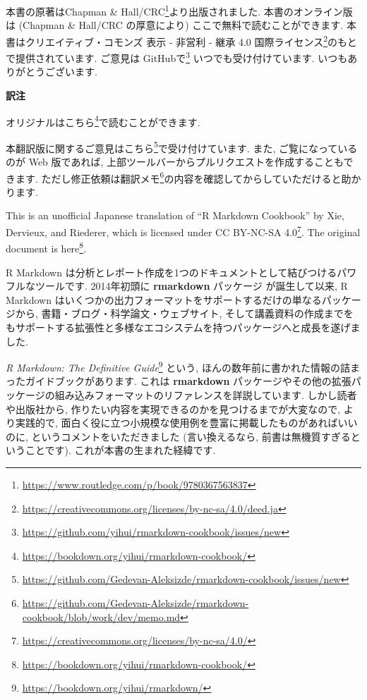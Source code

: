 \documentclass[
  11pt,
  lualatex,ja=standard,jafont=noto]{bxjsreport}
\newenvironment{infobox}[1]{\begin{itemize}\renewcommand{\labelitemi}{\raisebox{-.7\height}[0pt][0pt]{%
  {\setkeys{Gin}{width=3em,keepaspectratio}\texttt{[image: \_latex/\_img/\#1]}}}}
  \setlength{\fboxsep}{1em}
  \begin{greyblock}
  \item
  }{\end{greyblock}\end{itemize}
}
\renewcommand{\href}[2]{#2\footnote{\url{#1}}}
\begin{document}
\begin{infobox}{caution}
本書の原著は\href{https://www.routledge.com/p/book/9780367563837}{Chapman \& Hall/CRC}より出版されました. 本書のオンライン版は (Chapman \& Hall/CRC の厚意により) ここで無料で読むことができます. 本書は\href{https://creativecommons.org/licenses/by-nc-sa/4.0/deed.ja}{クリエイティブ・コモンズ 表示 - 非営利 - 継承 4.0 国際ライセンス}のもとで提供されています. ご意見は \href{https://github.com/yihui/rmarkdown-cookbook/issues/new}{GitHubで} いつでも受け付けています. いつもありがとうございます.

\begin{center}
\textbf{訳注}

\end{center}

オリジナルは\href{https://bookdown.org/yihui/rmarkdown-cookbook/}{こちら}で読むことができます.

本翻訳版に関するご意見は\href{https://github.com/Gedevan-Aleksizde/rmarkdown-cookbook/issues/new}{こちら}で受け付けています. また, ご覧になっているのが Web 版であれば, 上部ツールバーからプルリクエストを作成することもできます. ただし修正依頼は\href{https://github.com/Gedevan-Aleksizde/rmarkdown-cookbook/blob/work/dev/memo.md}{翻訳メモ}の内容を確認してからしていただけると助かります.

This is an unofficial Japanese translation of ``R Markdown Cookbook'' by Xie, Dervieux, and Riederer, which is licensed under \href{https://creativecommons.org/licenses/by-nc-sa/4.0/}{CC BY-NC-SA 4.0}. The original document is \href{https://bookdown.org/yihui/rmarkdown-cookbook/}{here}.

\end{infobox}

R Markdown は分析とレポート作成を1つのドキュメントとして結びつけるパワフルなツールです. 2014年初頭に \textbf{rmarkdown} パッケージ \autocite{R-rmarkdown} が誕生して以来, R Markdown はいくつかの出力フォーマットをサポートするだけの単なるパッケージから, 書籍・ブログ・科学論文・ウェブサイト, そして講義資料の作成までをもサポートする拡張性と多様なエコシステムを持つパッケージへと成長を遂げました.

\href{https://bookdown.org/yihui/rmarkdown/}{\emph{R Markdown: The Definitive Guide}} \autocite{rmarkdown2018} という, ほんの数年前に書かれた情報の詰まったガイドブックがあります. これは \textbf{rmarkdown} パッケージやその他の拡張パッケージの組み込みフォーマットのリファレンスを詳説しています. しかし読者や出版社から, 作りたい内容を実現できるのかを見つけるまでが大変なので, より実践的で, 面白く役に立つ小規模な使用例を豊富に掲載したものがあればいいのに, というコメントをいただきました (言い換えるなら, 前書は無機質すぎるということです). これが本書の生まれた経緯です.
\end{document}
